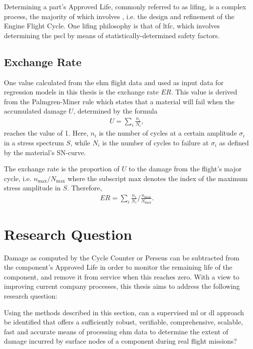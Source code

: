 Determining a part's Approved Life, commonly referred to as lifing, is a complex process, the majority of which involves  \cite{corran_lifing_2007}, i.e. the design and refinement of the Engine Flight Cycle. One lifing philosophy is that of \ac{ltfc}, which involves determining the \ac{pscl} by means of statistically-determined safety factors.

\subsection{Exchange Rate}
One value calculated from the \ac{ehm} flight data and used as input data for regression models in this thesis is the exchange rate \(ER\). This value is derived from the Palmgren-Miner rule \cite[]{palmgren_lebensdauer_1924} which states that a material will fail when the accumulated damage \(U\), determined by the formula
\begin{align}
    U = \sum_{i}{\frac{n_i}{N_i}},
\end{align}
reaches the value of 1. Here, \(n_i\) is the number of cycles at a certain amplitude \(\sigma_i\) in a stress spectrum \(S\), while \(N_i\) is the number of cycles to failure at \(\sigma_i\) as defined by the material's SN-curve.

The exchange rate is the proportion of \(U\) to the damage from the flight's major cycle, i.e. \(n_{\text{max}} / N_{\text{max}}\) where the subscript \(\text{max}\) denotes the index of the maximum stress amplitude in \(S\). Therefore,
\begin{align}
    ER = \sum_{i}{\frac{n_i}{N_i}} \Big/ {\frac{n_{\text{max}}}{N_{\text{max}}}}.
\end{align}
\section{Research Question} \label{sec:research_q}
Damage as computed by the Cycle Counter or Perseus can be subtracted from the component's Approved Life in order to monitor the remaining life of the component, and remove it from service when this reaches zero. With a view to improving current company processes, this thesis aims to address the following research question:

Using the methods described in this section, can a supervised \ac{ml} or \ac{dl} approach be identified that offers a sufficiently robust, verifiable, comprehensive, scalable, fast and accurate means of processing \ac{ehm} data to determine the extent of damage incurred by surface nodes of a component during real flight missions?

